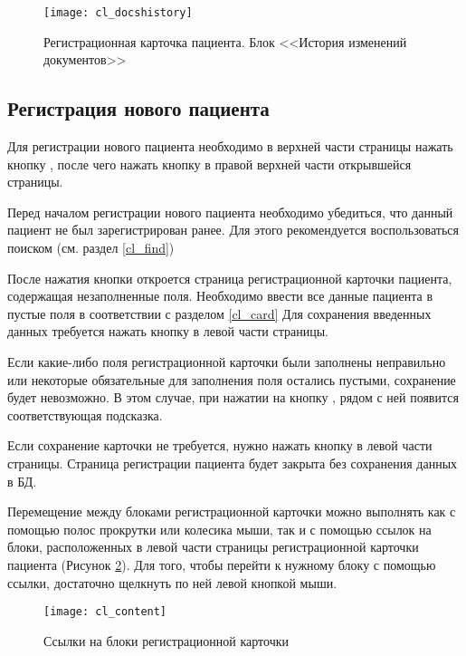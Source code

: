 {\begin{figure}[ht]\centering
 \texttt{[image: cl\_docshistory]}
 \caption{Регистрационная карточка пациента. Блок <<История изменений документов>>}
 \label{img_cl_docshistory}
\end{figure} 


\subsection{Регистрация нового пациента} \label{cl_new}

Для регистрации нового пациента необходимо в верхней части страницы нажать кнопку , после чего нажать кнопку   в правой верхней части открывшейся страницы.

\begin{vnim}
Перед началом регистрации нового пациента необходимо убедиться, что данный пациент не был зарегистрирован ранее. Для этого рекомендуется воспользоваться поиском (см. раздел \ref{cl_find})
\end{vnim}

После нажатия кнопки  откроется страница регистрационной карточки пациента,  содержащая незаполненные поля. Необходимо ввести все данные пациента в пустые поля в соответствии с разделом \ref{cl_card} Для сохранения введенных данных требуется нажать кнопку  в левой части страницы.

Если какие-либо поля регистрационной карточки были заполнены неправильно или некоторые обязательные для заполнения поля остались пустыми, сохранение будет невозможно. В этом случае, при нажатии на кнопку , рядом с ней появится соответствующая подсказка.

Если сохранение карточки не требуется, нужно нажать кнопку  в левой части страницы. Страница регистрации пациента будет закрыта без сохранения данных в БД.

Перемещение между блоками регистрационной карточки можно выполнять как с помощью полос прокрутки или колесика мыши, так и с помощью ссылок на блоки, расположенных в левой части страницы регистрационной карточки пациента (Рисунок \ref{img_cl_content}). Для того, чтобы перейти к нужному блоку с помощью ссылки, достаточно щелкнуть по ней левой кнопкой мыши.

\begin{figure}[ht]\centering
 \texttt{[image: cl\_content]}
 \caption{Ссылки на блоки регистрационной карточки}
 \label{img_cl_content}
\end{figure} 

}
